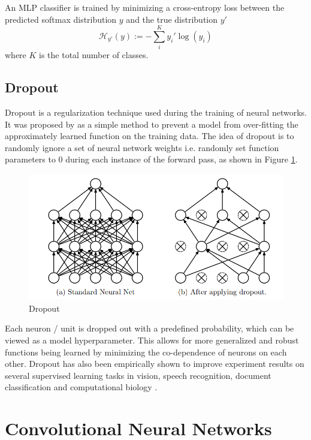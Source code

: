 An MLP classifier is trained by minimizing a cross-entropy loss between the predicted softmax distribution $y$ and the true distribution $y'$
\begin{equation}
	\mathcal{H}_{y'} (y) := - \sum_{i}^K y_{i}' \log (y_i)
\end{equation}
where $K$ is the total number of classes.


\subsection{Dropout}

Dropout is a regularization technique used during the training of neural networks. It was proposed by \cite{srivastava2014dropout} as a simple method to prevent a model from over-fitting the approximately learned function on the training data. The idea of dropout is to randomly ignore a set of neural network weights i.e. randomly set function parameters to 0 during each instance of the forward pass, as shown in Figure \ref{fig:dropout}.

\begin{figure}[ht]
	\centering
	\includegraphics[width=\textwidth]{images/dropout}
	\caption{\label{fig:dropout} Dropout}
\end{figure}

Each neuron / unit is dropped out with a predefined probability, which can be viewed as a model hyperparameter. This allows for more generalized and robust functions being learned by minimizing the co-dependence of neurons on each other. Dropout has also been empirically shown to improve experiment results on several supervised learning tasks in vision, speech recognition, document classification and computational biology \citep{srivastava2014dropout}.


\section{Convolutional Neural Networks}

